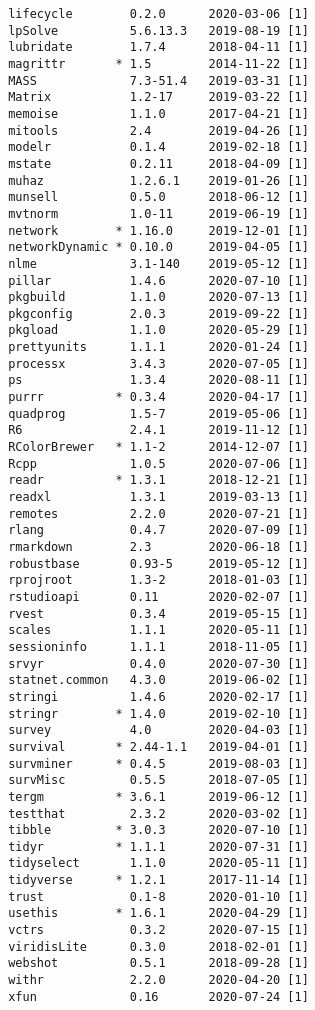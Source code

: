 \documentclass [11pt, proquest] {uwthesis}[2015/03/03]
\begin{document}
\begin{verbatim}
 lifecycle        0.2.0      2020-03-06 [1]
 lpSolve          5.6.13.3   2019-08-19 [1]
 lubridate        1.7.4      2018-04-11 [1]
 magrittr       * 1.5        2014-11-22 [1]
 MASS             7.3-51.4   2019-03-31 [1]
 Matrix           1.2-17     2019-03-22 [1]
 memoise          1.1.0      2017-04-21 [1]
 mitools          2.4        2019-04-26 [1]
 modelr           0.1.4      2019-02-18 [1]
 mstate           0.2.11     2018-04-09 [1]
 muhaz            1.2.6.1    2019-01-26 [1]
 munsell          0.5.0      2018-06-12 [1]
 mvtnorm          1.0-11     2019-06-19 [1]
 network        * 1.16.0     2019-12-01 [1]
 networkDynamic * 0.10.0     2019-04-05 [1]
 nlme             3.1-140    2019-05-12 [1]
 pillar           1.4.6      2020-07-10 [1]
 pkgbuild         1.1.0      2020-07-13 [1]
 pkgconfig        2.0.3      2019-09-22 [1]
 pkgload          1.1.0      2020-05-29 [1]
 prettyunits      1.1.1      2020-01-24 [1]
 processx         3.4.3      2020-07-05 [1]
 ps               1.3.4      2020-08-11 [1]
 purrr          * 0.3.4      2020-04-17 [1]
 quadprog         1.5-7      2019-05-06 [1]
 R6               2.4.1      2019-11-12 [1]
 RColorBrewer   * 1.1-2      2014-12-07 [1]
 Rcpp             1.0.5      2020-07-06 [1]
 readr          * 1.3.1      2018-12-21 [1]
 readxl           1.3.1      2019-03-13 [1]
 remotes          2.2.0      2020-07-21 [1]
 rlang            0.4.7      2020-07-09 [1]
 rmarkdown        2.3        2020-06-18 [1]
 robustbase       0.93-5     2019-05-12 [1]
 rprojroot        1.3-2      2018-01-03 [1]
 rstudioapi       0.11       2020-02-07 [1]
 rvest            0.3.4      2019-05-15 [1]
 scales           1.1.1      2020-05-11 [1]
 sessioninfo      1.1.1      2018-11-05 [1]
 srvyr            0.4.0      2020-07-30 [1]
 statnet.common   4.3.0      2019-06-02 [1]
 stringi          1.4.6      2020-02-17 [1]
 stringr        * 1.4.0      2019-02-10 [1]
 survey           4.0        2020-04-03 [1]
 survival       * 2.44-1.1   2019-04-01 [1]
 survminer      * 0.4.5      2019-08-03 [1]
 survMisc         0.5.5      2018-07-05 [1]
 tergm          * 3.6.1      2019-06-12 [1]
 testthat         2.3.2      2020-03-02 [1]
 tibble         * 3.0.3      2020-07-10 [1]
 tidyr          * 1.1.1      2020-07-31 [1]
 tidyselect       1.1.0      2020-05-11 [1]
 tidyverse      * 1.2.1      2017-11-14 [1]
 trust            0.1-8      2020-01-10 [1]
 usethis        * 1.6.1      2020-04-29 [1]
 vctrs            0.3.2      2020-07-15 [1]
 viridisLite      0.3.0      2018-02-01 [1]
 webshot          0.5.1      2018-09-28 [1]
 withr            2.2.0      2020-04-20 [1]
 xfun             0.16       2020-07-24 [1]

\end{verbatim}
\end{document}
